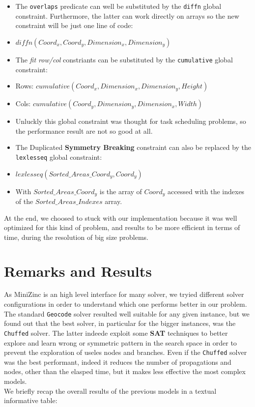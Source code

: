 \begin{itemize}
    \item The \texttt{overlaps} predicate can well be substituted by the \texttt{diffn} global constraint.
            Furthermore, the latter can work directly on arrays so the new constraint will be just one line of code:
    \item[] $diffn(Coord_x, Coord_y, Dimension_x, Dimension_y)$
    \item The \textit{fit row/col} constriants can be substituted by the \texttt{cumulative} global constraint:
    \item[] Rows: $cumulative(Coord_x, Dimension_x, Dimension_y, Height)$
    \item[] Cols: $cumulative(Coord_y, Dimension_y, Dimension_x, Width)$
    \item[] Unluckly this global constraint was thought for task scheduling problems, so the performance result are not so good at all.
    \item The Duplicated \textbf{Symmetry Breaking} constraint can also be replaced by the \texttt{lexlesseq} global constraint:
    \item[] $lexlesseq(Sorted\_Areas\_Coord_y, Coord_y)$
    \item[] With $Sorted\_Areas\_Coord_y$ is the array of $Coord_y$ accessed with the indexes of the $Sorted\_Areas\_Indexes$ array.   
\end{itemize}

At the end, we choosed to stuck with our implementation because it was well optimized for this kind of problem, and results to be more
efficient in terms of time, during the resolution of big size problems.




\section{Remarks and Results}
As MiniZinc is an high level interface for many solver, we tryied different solver configurations in order to understand which one performs better
in our problem. The standard \texttt{Geocode} solver resulted well suitable for any given instance, but we found out that the best solver, in particular
for the bigger instances, was the \texttt{Chuffed} solver. The latter indeede exploit some \textbf{SAT} techniques to better explore and learn wrong or symmetric
pattern in the search space in order to prevent the exploration of useles nodes and branches. Even if the \texttt{Chuffed} solver was the best performant,
indeed it reduces the number of propagations and nodes, other than the elasped time, but it makes less effective the most complex models.\\ 

We briefly recap the overall results of the previous models in a textual informative table:

